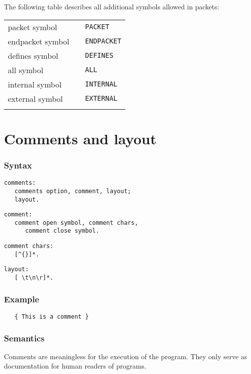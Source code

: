 \documentclass [a4paper,12pt,fleqn]{article}
\begin{document}
The following table describes all additional symbols allowed in
packets:
\begin{center}
\begin{tabular}{lll}
packet symbol & & \verb+PACKET+\\
endpacket symbol & & \verb+ENDPACKET+\\
defines symbol & & \verb+DEFINES+\\
all symbol & & \verb+ALL+\\
internal symbol & & \verb+INTERNAL+\\
external symbol & & \verb+EXTERNAL+\\
\hspace*{8em} & \hspace*{2em} & \hspace*{8em}
\end {tabular}
\end {center}
\section {Comments and layout}
\subsubsection*{Syntax}
\begin {letterlist}
\item
\begin{verbatim}
comments:
   comments option, comment, layout;
   layout.
\end{verbatim}
\item
\begin{verbatim}
comment:
   comment open symbol, comment chars,
      comment close symbol.
\end{verbatim}
\item
\begin{verbatim}
comment chars:
   [^{}]*.
\end{verbatim}
\item
\begin{verbatim}
layout:
   [ \t\n\r]*.
\end{verbatim}
\end {letterlist}
\subsubsection*{Example}
\begin{verbatim}
   { This is a comment }
\end{verbatim}
\subsubsection*{Semantics}
Comments are meaningless for the execution of the program. They
only serve as documentation for human readers of programs.
\end{document}
